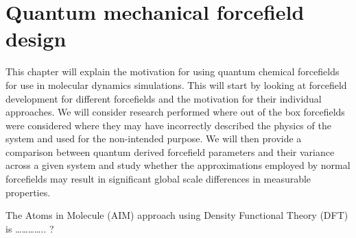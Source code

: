 

\section{Quantum mechanical forcefield design}
This chapter will explain the motivation for using quantum chemical forcefields for use in molecular dynamics simulations. This will start by looking at forcefield development for different forcefields and the motivation for their individual approaches. We will consider research performed where out of the box forcefields were considered where they may have incorrectly described the physics of the system and used for the non-intended purpose. We will then provide a comparison between quantum derived forcefield parameters and their variance across a given system and study whether the approximations employed by normal forcefields may result in significant global scale differences in measurable properties. 

The Atoms in Molecule (AIM) approach using Density Functional Theory (DFT) is ………….. ? 

